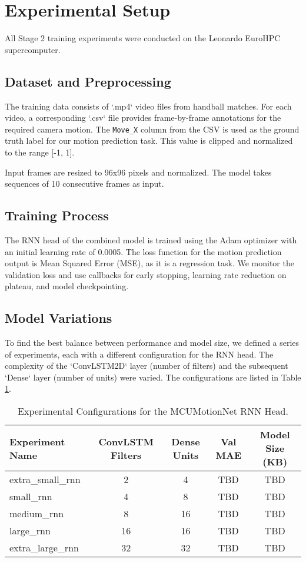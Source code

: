 \documentclass{article}
\begin{document}
\section{Experimental Setup}
All Stage 2 training experiments were conducted on the Leonardo EuroHPC supercomputer.

\subsection{Dataset and Preprocessing}
The training data consists of `.mp4` video files from handball matches. For each video, a corresponding `.csv` file provides frame-by-frame annotations for the required camera motion. The \texttt{Move\_X} column from the CSV is used as the ground truth label for our motion prediction task. This value is clipped and normalized to the range [-1, 1].

Input frames are resized to 96x96 pixels and normalized. The model takes sequences of 10 consecutive frames as input.

\subsection{Training Process}
The RNN head of the combined model is trained using the Adam optimizer with an initial learning rate of 0.0005. The loss function for the motion prediction output is Mean Squared Error (MSE), as it is a regression task. We monitor the validation loss and use callbacks for early stopping, learning rate reduction on plateau, and model checkpointing.

\subsection{Model Variations}
To find the best balance between performance and model size, we defined a series of experiments, each with a different configuration for the RNN head. The complexity of the `ConvLSTM2D` layer (number of filters) and the subsequent `Dense` layer (number of units) were varied. The configurations are listed in Table \ref{tab:experiments}.

\begin{table}[h!]
\centering
\caption{Experimental Configurations for the MCUMotionNet RNN Head.}
\label{tab:experiments}
\begin{tabular}{|l|c|c|c|c|}
\hline
\textbf{Experiment Name} & \textbf{ConvLSTM Filters} & \textbf{Dense Units} & \textbf{Val MAE} & \textbf{Model Size (KB)} \\ \hline
extra\_small\_rnn & 2 & 4 & TBD & TBD \\
small\_rnn & 4 & 8 & TBD & TBD \\
medium\_rnn & 8 & 16 & TBD & TBD \\
large\_rnn & 16 & 16 & TBD & TBD \\
extra\_large\_rnn & 32 & 32 & TBD & TBD \\ \hline
\end{tabular}
\end{table}
\end{document}
